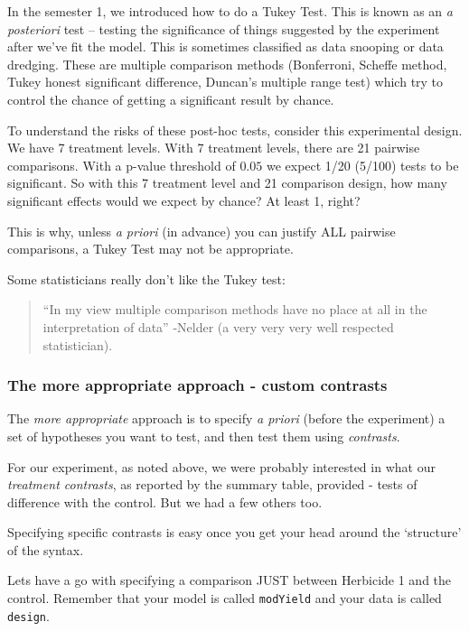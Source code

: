 \documentclass[
]{book}
\begin{document}
In the semester 1, we introduced how to do a Tukey Test. This is known as an \emph{a posteriori} test -- testing the significance of things suggested by the experiment after we've fit the model. This is sometimes classified as data snooping or data dredging. These are multiple comparison methods (Bonferroni, Scheffe method, Tukey honest significant difference, Duncan's multiple range test) which try to control the chance of getting a significant result by chance.

To understand the risks of these post-hoc tests, consider this experimental design. We have 7 treatment levels. With 7 treatment levels, there are 21 pairwise comparisons. With a p-value threshold of \(0.05\) we expect 1/20 (5/100) tests to be significant. So with this 7 treatment level and 21 comparison design, how many significant effects would we expect by chance? At least 1, right?

This is why, unless \emph{a priori} (in advance) you can justify ALL pairwise comparisons, a Tukey Test may not be appropriate.

Some statisticians really don't like the Tukey test:

\begin{quote}
``In my view multiple comparison methods have no place at all in the interpretation of data'' -Nelder (a very very very well respected statistician).
\end{quote}

\subsubsection{The more appropriate approach - custom contrasts}\label{the-more-appropriate-approach---custom-contrasts}

The \emph{more appropriate} approach is to specify \emph{a priori} (before the experiment) a set of hypotheses you want to test, and then test them using \emph{contrasts}.

For our experiment, as noted above, we were probably interested in what our \emph{treatment contrasts}, as reported by the summary table, provided - tests of difference with the control. But we had a few others too.

Specifying specific contrasts is easy once you get your head around the `structure' of the syntax.

Lets have a go with specifying a comparison JUST between Herbicide 1 and the control. Remember that your model is called \texttt{modYield} and your data is called \texttt{design}.
\end{document}

